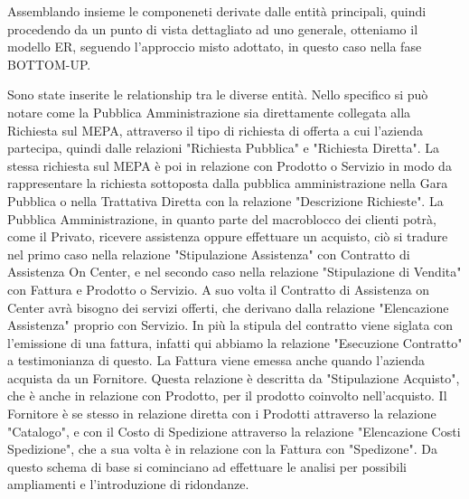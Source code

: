 Assemblando insieme le componeneti derivate dalle entità principali, quindi procedendo da un punto di vista dettagliato ad uno generale, otteniamo il modello ER, seguendo l'approccio misto adottato, in questo caso nella fase BOTTOM-UP. 

\noindent{}

Sono state inserite le relationship tra le diverse entità.\newline
Nello specifico si può notare come la Pubblica Amministrazione sia direttamente collegata alla Richiesta sul MEPA, attraverso il tipo di richiesta di offerta a cui l'azienda partecipa, quindi dalle relazioni "Richiesta Pubblica" e "Richiesta Diretta". La stessa richiesta sul MEPA è poi in relazione con Prodotto o Servizio in modo da rappresentare la richiesta sottoposta dalla pubblica amministrazione nella Gara Pubblica o nella Trattativa Diretta con la relazione "Descrizione Richieste".\newline
La Pubblica Amministrazione, in quanto parte del macroblocco dei clienti potrà, come il Privato, ricevere assistenza oppure effettuare un acquisto, ciò si tradure nel primo caso nella relazione "Stipulazione Assistenza" con Contratto di Assistenza On Center, e nel secondo caso nella relazione "Stipulazione di Vendita" con Fattura e Prodotto o Servizio.\newline
A suo volta il Contratto di Assistenza on Center avrà bisogno dei servizi offerti, che derivano dalla relazione "Elencazione Assistenza" proprio con Servizio. In più la stipula del contratto viene siglata con l'emissione di una fattura, infatti qui abbiamo la relazione "Esecuzione Contratto" a testimonianza di questo.\newline
La Fattura viene emessa anche quando l'azienda acquista da un Fornitore. Questa relazione è descritta da "Stipulazione Acquisto", che è anche in relazione con Prodotto, per il prodotto coinvolto nell'acquisto.\newline
Il Fornitore è se stesso in relazione diretta con i Prodotti attraverso la relazione "Catalogo", e con il Costo di Spedizione attraverso la relazione "Elencazione Costi Spedizione", che a sua volta è in relazione con la Fattura con "Spedizone".
\newline
Da questo schema di base si cominciano ad effettuare le analisi per possibili ampliamenti e l'introduzione di ridondanze.